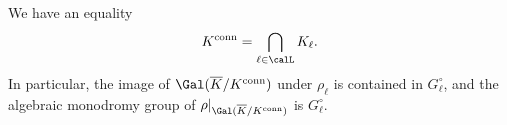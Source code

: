 \begin{theorem}
    We have an equality
    $$K^{\text{conn}} = \bigcap_{\ell \in \calL} K_\ell.$$
    In particular, the image of $\Gal(\overline{K} / K^{\text{conn}})$ under $\rho_\ell$ is contained in $G_\ell^\circ$, and the algebraic monodromy group of $\rho|_{\Gal(\overline{K}/K^{\text{conn}})}$ is $G_\ell^\circ$.

    



\end{theorem}

